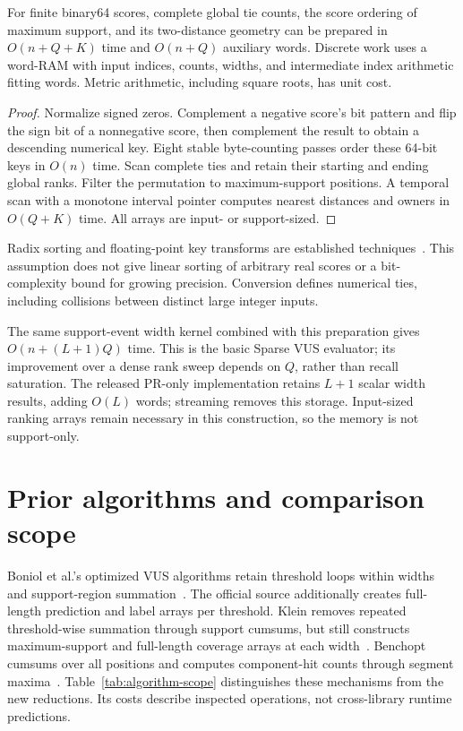 \begin{proposition}
\label{prop:radix}
For finite binary64 scores, complete global tie counts, the score ordering
of maximum support, and its two-distance geometry can be prepared in
$O(n+Q+K)$ time and $O(n+Q)$ auxiliary words. Discrete work uses a word-RAM
with input indices, counts, widths, and intermediate index arithmetic
fitting words. Metric arithmetic, including square roots, has unit cost.
\end{proposition}
\begin{proof}
Normalize signed zeros. Complement a negative score's bit pattern and flip
the sign bit of a nonnegative score, then complement the result to obtain a
descending numerical key. Eight stable byte-counting passes order these
64-bit keys in $O(n)$ time. Scan complete ties and retain their starting and
ending global ranks. Filter the permutation to maximum-support positions.
A temporal scan with a monotone interval pointer computes nearest distances
and owners in $O(Q+K)$ time. All arrays are input- or support-sized.
\end{proof}
Radix sorting and floating-point key transforms are established
techniques~\cite{demaine2011radix,herf2001radix}. This assumption does not give
linear sorting of arbitrary real scores or a bit-complexity bound for growing
precision. Conversion defines numerical ties, including collisions between
distinct large integer inputs.

The same support-event width kernel combined with this preparation gives
$O(n+(L+1)Q)$ time. This is the basic Sparse VUS evaluator; its improvement
over a dense rank sweep depends on $Q$, rather than recall saturation.
The released PR-only implementation retains $L+1$ scalar width results,
adding $O(L)$ words; streaming removes this storage. Input-sized ranking
arrays remain necessary in this construction, so the memory is not
support-only.

\section{Prior algorithms and comparison scope}
Boniol et al.'s optimized VUS algorithms retain threshold loops within
widths and support-region summation~\cite{boniol2025}. The official source
additionally creates full-length prediction and label arrays per threshold.
Klein removes repeated threshold-wise summation through support cumsums,
but still constructs maximum-support and full-length coverage arrays at
each width~\cite{klein2026}. Benchopt cumsums over all positions and computes
component-hit counts through segment maxima~\cite{benchopt2026}.
Table~\ref{tab:algorithm-scope} distinguishes these mechanisms from the
new reductions. Its costs describe inspected operations, not cross-library
runtime predictions.

